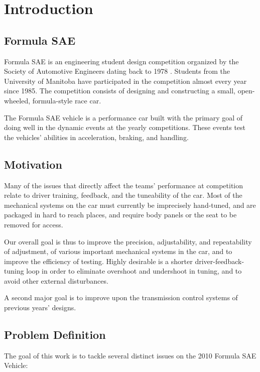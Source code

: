 \chapter{Introduction\label{cha:introduction}}

\section{Formula SAE}

Formula SAE is an engineering student design competition organized by the Society of Automotive Engineers dating back to 1978 \cite{fsaehistory}. Students from the University of Manitoba have participated in the competition almost every year since 1985. The competition consists of designing and constructing a small, open-wheeled, formula-style race car.

The Formula SAE vehicle is a performance car built with the primary goal of doing well in the dynamic events at the yearly competitions. These events test the vehicles' abilities in acceleration, braking, and handling. 

\section{Motivation}

Many of the issues that directly affect the teams' performance at competition relate to driver training, feedback, and the tuneability of the car. Most of the mechanical systems on the car must currently be imprecisely hand-tuned, and are packaged in hard to reach places, and require body panels or the seat to be removed for access.

Our overall goal is thus to improve the precision, adjustability, and repeatability of adjustment, of various important mechanical systems in the car, and to improve the efficiency of testing. Highly desirable is a shorter driver-feedback-tuning loop in order to eliminate overshoot and undershoot in tuning, and to avoid other external disturbances.

A second major goal is to improve upon the transmission control systems of previous years' designs.

\section{Problem Definition}

The goal of this work is to tackle several distinct issues on the 2010 Formula SAE Vehicle:

